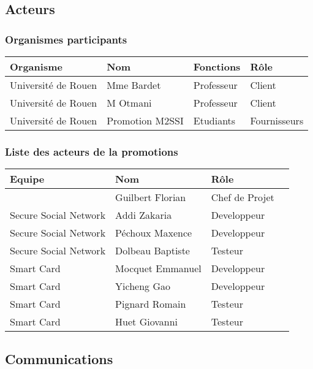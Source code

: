 \documentclass[a4paper,11pt,french]{article}
\begin{document}
\subsection{Acteurs}
\subsubsection{Organismes participants}
\begin{center}
	\begin{tabularx}{16cm}{|X|X|X|X|}
	\hline
	\bfseries{Organisme} & \bfseries{Nom} & \bfseries{Fonctions} & \bfseries{Rôle}\\
	\hline
	Université de Rouen & Mme Bardet & Professeur & Client\\
	\hline
	Université de Rouen & M Otmani & Professeur & Client\\
	\hline
	Université de Rouen & Promotion M2SSI & Etudiants & Fournisseurs\\
	\hline
	\end{tabularx}
\end{center}
\vspace*{0cm}

\subsubsection{Liste des acteurs de la promotions}
\begin{center}
	\begin{tabularx}{16cm}{|X|X|X|X|}
	\hline
	\bfseries{Equipe} & \bfseries{Nom} & \bfseries{Rôle}\\
	\hline
		& Guilbert Florian & Chef de Projet\\
	\hline
	Secure Social Network & Addi Zakaria & Developpeur\\
	\hline
	Secure Social Network & Péchoux Maxence & Developpeur\\
	\hline
	Secure Social Network & Dolbeau Baptiste & Testeur\\
	\hline
	Smart Card & Mocquet Emmanuel & Developpeur\\
	\hline
	Smart Card & Yicheng Gao & Developpeur\\
	\hline
	Smart Card & Pignard Romain & Testeur\\
	\hline
	Smart Card & Huet Giovanni & Testeur\\
	\hline
	\end{tabularx}
\end{center}
\vspace*{0cm}

\subsection{Communications}
\end{document}

